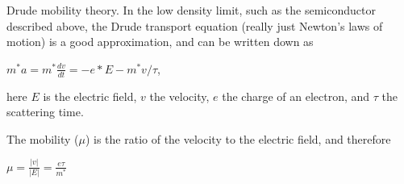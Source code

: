 \documentclass{oxmathproblems}
\begin{document}
\begin{questions}
\begin{solution}
\end{solution}
  

\miquestion

Drude mobility theory. In the low density limit, such as the semiconductor
described above, the Drude transport equation (really just Newton's laws of
motion) is a good approximation, and can be written down as

$m^* a = m^* \frac{dv}{dt} = -e*E - m^* v / \tau$,

here $E$ is the electric field, $v$ the velocity, $e$ the charge of an
electron, and $\tau$ the scattering time. 

The mobility ($\mu$) is the ratio of the velocity to the electric field, and therefore 

$\mu = \frac{|v|}{|E|} = \frac{e\tau}{m^*}$


\begin{solution}
\begin{parts}

\end{parts}
\end{solution}
\end{questions}
\end{document}

